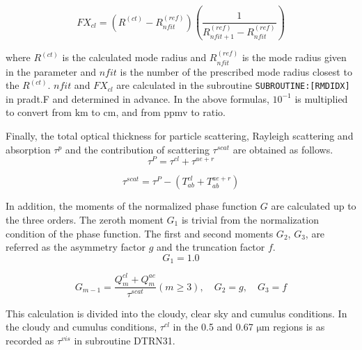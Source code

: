 \begin{equation}
F X_{c l}=\left(R^{(c t)}-R_{n f i t}^{(r e f)}\right)\left(\frac{1}{R_{n f i t+1}^{(r e f)}-R_{n f i t}^{(r e f)}}\right)
\end{equation}

where \(R^{(ct)}\) is the calculated mode radius and
\(R_{n f i t}^{(r e f)}\) is the mode radius given in the parameter and
\(nfit\) is the number of the prescribed mode radius closest to the
\(R^{(ct)}\). \(nfit\) and \(FX_{cl}\) are calculated in the subroutine
\texttt{SUBROUTINE:{[}RMDIDX{]}} in pradt.F and determined in advance.
In the above formulas, \(10^{-1}\) is multiplied to convert from
\(\mathrm{km}\) to \(\mathrm{cm}\), and from ppmv to ratio.

Finally, the total optical thickness for particle scattering, Rayleigh
scattering and absorption \(\tau^p\) and the contribution of scattering
\(\tau^{scat}\) are obtained as follows. \begin{equation}
\tau^{P}=\tau^{c l}+\tau^{a e+r}
\end{equation}

\begin{equation}
\tau^{s c a t}=\tau^{P}-\left(T_{ab}^{c l}+T_{ab}^{a e+r}\right)
\end{equation}

In addition, the moments of the normalized phase function \(G\) are
calculated up to the three orders. The zeroth moment \(G_1\) is trivial
from the normalization condition of the phase function. The first and
second moments \(G_2\), \(G_3\), are referred as the asymmetry factor
\(g\) and the truncation factor \(f\). \begin{equation}
G_{1}=1.0
\end{equation}

\begin{equation}
G_{m-1}=\frac{Q_{m}^{c l}+Q_{m}^{ae}}{\tau^{s c a t}}(m \geq 3), \quad G_{2}=g, \quad G_{3}=f
\end{equation}

This calculation is divided into the cloudy, clear sky and cumulus
conditions. In the cloudy and cumulus conditions, \(\tau^{cl}\) in the
0.5 and 0.67 \(\mathrm{{\mu}m}\) regions is as recorded as
\(\tau^{vis}\) in subroutine DTRN31.

